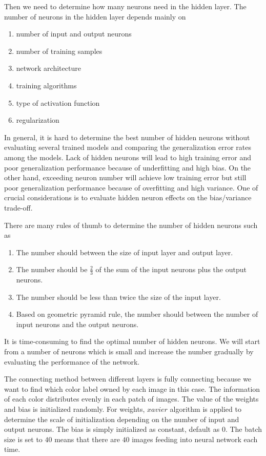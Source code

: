 Then we need to determine how many neurons need in the hidden layer. The number of neurons in the hidden layer depends mainly on
\begin{enumerate}
  \item number of input and output neurons
  \item number of training samples
  \item network architecture
  \item training algorithms
  \item type of activation function
  \item regularization
\end{enumerate}
In general, it is hard to determine the best number of hidden neurons without evaluating several trained models and comparing the generalization error rates among the models. Lack of hidden neurons will lead to high training error and poor generalization performance because of underfitting and high bias. On the other hand, exceeding neuron number will achieve low training error but still poor generalization performance because of overfitting and high variance. One of crucial considerations is to evaluate hidden neuron effects on the bias/variance trade-off.

There are many rules of thumb to determine the number of hidden neurons \citep{heaton2008introduction} such as
\begin{enumerate}
  \item The number should between the size of input layer and output layer.
  \item The number should be $\frac{2}{3}$ of the sum of the input neurons plus the output neurons.
  \item The number should be less than twice the size of the input layer.
  \item Based on geometric pyramid rule, the number should between the number of input neurons and the output neurons.
\end{enumerate}
It is time-consuming to find the optimal number of hidden neurons. We will start from a number of neurons which is small and increase the number gradually by evaluating the performance of the network.

The connecting method between different layers is fully connecting because we want to find which color label owned by each image in this case. The information of each color distributes evenly in each patch of images. The value of the weights and bias is initialized randomly. For weights, $xavier$ algorithm is applied to determine the scale of initialization depending on the number of input and output neurons. The bias is simply initialized as constant, default as $0$. The batch size is set to $40$ means that there are $40$ images feeding into neural network each time.

